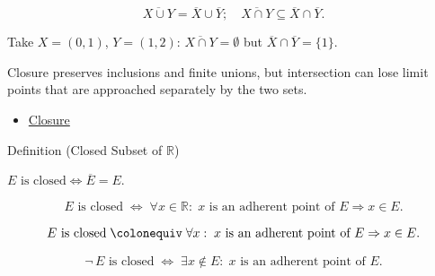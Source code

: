 \begin{remark*}
\[
  \overline{X \cup Y} = \overline{X} \cup \overline{Y};\quad
  \overline{X \cap Y} \subseteq \overline{X} \cap \overline{Y}.
\]
\end{remark*}

\begin{remark*}
Take $X = (0,1)$, $Y = (1,2)$: $\overline{X\cap Y} = \emptyset$ but
$\overline{X}\cap\overline{Y} = \{1\}$.
\end{remark*}

\begin{remark*}[Interpretation]
Closure preserves inclusions and finite unions, but intersection can lose
limit points that are approached separately by the two sets.
\end{remark*}

\begin{dependencies}
\begin{itemize}
  \item \hyperref[def:closure-r]{Closure}
\end{itemize}
\end{dependencies}


\begin{definitionbox}{Definition (Closed Subset of $\mathbb{R}$)}
\begin{definition}
\label{def:closed-set-r}
$E\text{ is closed} \iff \overline{E} = E$.
\end{definition}
\end{definitionbox}

\begin{remark*}
\[
  E\text{ is closed}
  \;\iff\;
  \forall x \in \mathbb{R} :\;
  x\text{ is an adherent point of }E \Rightarrow x \in E.
\]
\end{remark*}

\begin{remark*}
\[
  E\text{ is closed}
  \;\colonequiv\;
  \forall x :\;
  x\text{ is an adherent point of }E \Rightarrow x \in E.
\]
\end{remark*}

\begin{remark*}
\[
  \neg\,E\text{ is closed}
  \;\iff\;
  \exists x \notin E :\; x\text{ is an adherent point of }E.
\]
\end{remark*}

